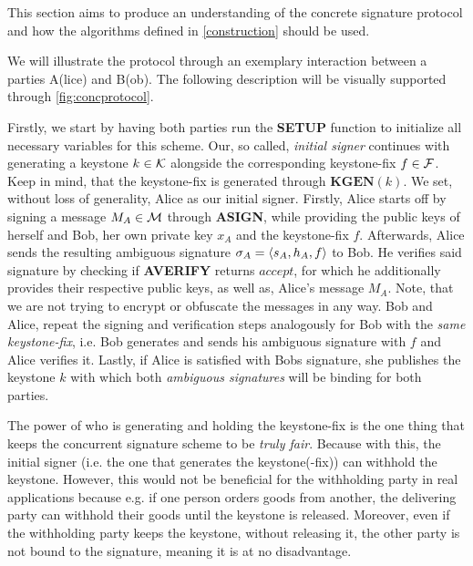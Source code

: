 This section aims to produce an understanding of the concrete signature protocol and how the algorithms defined in \autoref{construction} should be used.

We will illustrate the protocol through an exemplary interaction between a parties A(lice) and B(ob). 
The following description will be visually supported through \autoref{fig:concprotocol}. 

Firstly, we start by having both parties run the \textbf{SETUP} function to initialize all necessary variables for this scheme.
Our, so called, \textit{initial signer} continues with generating a keystone \(k\in\mathcal{K}\) alongside the corresponding keystone-fix \(f\in\mathcal{F}\).
Keep in mind, that the keystone-fix is generated through \(\textbf{KGEN}(k)\).
We set, without loss of generality, Alice as our initial signer.
Firstly, Alice starts off by signing a message \(M_A\in\mathcal{M}\) through \textbf{ASIGN}, while providing the public keys of herself and Bob, her own private key \(x_A\) and the keystone-fix \(f\).
Afterwards, Alice sends the resulting ambiguous signature \(\sigma_A = \langle s_A, h_A, f \rangle\) to Bob.
He verifies said signature by checking if \textbf{AVERIFY} returns \(accept\), for which he additionally provides their respective public keys, as well as, Alice's message \(M_A\).
Note, that we are not trying to encrypt or obfuscate the messages in any way.
Bob and Alice, repeat the signing and verification steps analogously for Bob with the \textit{same keystone-fix}, i.e. Bob generates and sends his ambiguous signature with \(f\) and Alice verifies it.
Lastly, if Alice is satisfied with Bobs signature, she publishes the keystone \(k\) with which both \textit{ambiguous signatures} will be binding for both parties.

The power of who is generating and holding the keystone-fix is the one thing that keeps the concurrent signature scheme to be \textit{truly fair}.
Because with this, the initial signer (i.e. the one that generates the keystone(-fix)) can withhold the keystone.
However, this would not be beneficial for the withholding party in real applications because e.g. if one person orders goods from another, the delivering party can withhold their goods until the keystone is released.
Moreover, even if the withholding party keeps the keystone, without releasing it, the other party is not bound to the signature, meaning it is at no disadvantage. 

